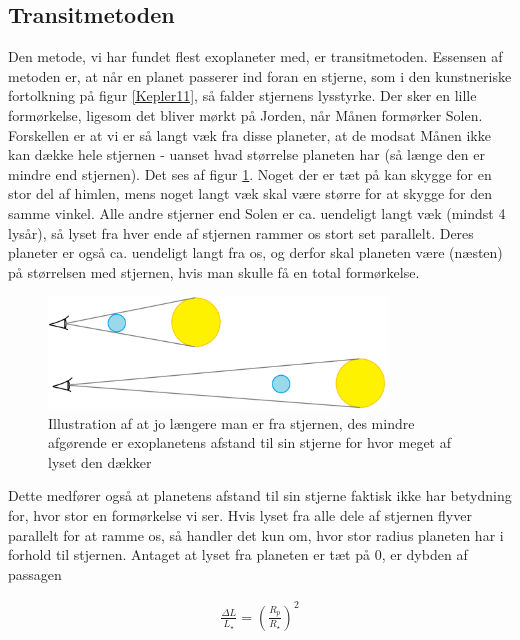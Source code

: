 \subsection*{Transitmetoden}

Den metode, vi har fundet flest exoplaneter med, er transitmetoden. Essensen af metoden er, at når en planet passerer ind foran en stjerne, som i den kunstneriske fortolkning på figur \ref{Kepler11}, så falder stjernens lysstyrke. Der sker en lille formørkelse, ligesom det bliver mørkt på Jorden, når Månen formørker Solen. Forskellen er at vi er så langt væk fra disse planeter, at de modsat Månen ikke kan dække hele stjernen - uanset hvad størrelse planeten har (så længe den er mindre end stjernen). Det ses af figur \ref{UbetydeligRadius}. Noget der er tæt på kan skygge for en stor del af himlen, mens noget langt væk skal være større for at skygge for den samme vinkel. Alle andre stjerner end Solen er ca. uendeligt langt væk (mindst 4 lysår), så lyset fra hver ende af stjernen rammer os stort set parallelt. Deres planeter er også ca. uendeligt langt fra os, og derfor skal planeten være (næsten) på størrelsen med stjernen, hvis man skulle få en total formørkelse.
\begin{figure}[h!]
    \centering
    \includegraphics[width = 0.8\textwidth]{Astrofysik/billeder/UbetydeligRadius.png} 
    \caption{Illustration af at jo længere man er fra stjernen, des mindre afgørende er exoplanetens afstand til sin stjerne for hvor meget af lyset den dækker}
    \label{UbetydeligRadius} %
\end{figure}

Dette medfører også at planetens afstand til sin stjerne faktisk ikke har betydning for, hvor stor en formørkelse vi ser. Hvis lyset fra alle dele af stjernen flyver parallelt for at ramme os, så handler det kun om, hvor stor radius planeten har i forhold til stjernen. Antaget at lyset fra planeten er tæt på 0, er dybden af passagen

\begin{align} \label{eq:DeltaL}
    \frac{\Delta L}{L_\star } = \left( \frac{R_p}{R_\star } \right)^2
\end{align}

